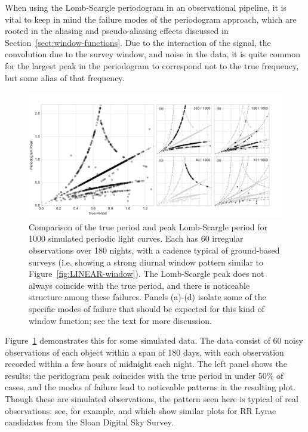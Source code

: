 \documentclass[preprint]{aastex}
\newcommand{\fig}[1]{Figure~\ref{fig:#1}}
\newcommand{\figlabel}[1]{\label{fig:#1}}
\newcommand{\Sect}[1]{Section~\ref{sect:#1}}
\newcommand{\sect}[1]{\Sect{#1}}
\begin{document}
When using the Lomb-Scargle periodogram in an observational pipeline, it is
vital to keep in mind the failure modes of the periodogram approach, which
are rooted in the aliasing and pseudo-aliasing effects discussed in
\sect{window-functions}.
Due to the interaction of the signal, the convolution due to the survey window,
and noise in the data, it is quite common for the largest peak in the
periodogram to correspond not to the true frequency, but some alias of that
frequency.

\begin{figure}[ht]
  \centering
  \includegraphics[width=\textwidth]{fig25_failure_modes}
  \caption{Comparison of the true period and peak Lomb-Scargle period for
    1000 simulated periodic light curves.
    Each has 60 irregular observations over 180 nights,
    with a cadence typical of ground-based surveys ({i.e.} showing a strong
    diurnal window pattern similar to \fig{LINEAR-window}).
    The Lomb-Scargle peak does not always coincide with the true period,
    and there is noticeable structure among these failures.
    Panels (a)-(d) isolate some of the specific modes of failure that should
    be expected for this kind of window function;
    see the text for more discussion.
    \figlabel{failure-modes}}
\end{figure}

\fig{failure-modes} demonstrates this for some simulated data.
The data consist of 60 noisy observations of each object within a span of
180 days, with each observation recorded within a few hours of midnight
each night.
The left panel shows the results: the peridogram peak coincides with the true
period in under 50\% of cases, and the modes of failure lead to noticeable
patterns in the resulting plot.
Though these are simulated observations, the pattern seen here is typical of
real observations: see, for example, \citet{VanderPlas2015}
and \citet{Long2016} which show similar plots for RR Lyrae candidates from
the Sloan Digital Sky Survey.
\end{document}

